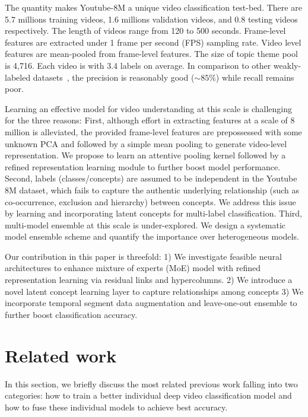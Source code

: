 \documentclass[10pt,twocolumn,letterpaper]{article}
\begin{document}


The quantity makes Youtube-8M a unique video classification test-bed. There are 5.7 millions training videos, 1.6 millions validation videos, and 0.8 testing videos respectively. The length of videos range from 120 to 500 seconds. Frame-level features are extracted under 1 frame per second (FPS) sampling rate. Video level features are mean-pooled from frame-level features. The size of topic theme pool is 4,716. Each video is with 3.4 labels on average. In comparison to other weakly-labeled datasets~\cite{jiang2017fcvid}, the precision is reasonably good ($\sim 85\%$) while recall remains poor.

Learning an effective model for video understanding at this scale is challenging for the three reasons:
First, although effort in extracting features at a scale of 8 million is alleviated, the provided frame-level features are prepossessed with some unknown PCA and followed by a simple mean pooling to generate video-level representation. We propose to learn an attentive pooling kernel followed by a refined representation learning module to further boost model performance. 
Second, labels (classes/concepts) are assumed to be independent in the Youtube 8M dataset, which fails to capture the authentic underlying relationship (such as co-occurrence, exclusion and hierarchy) between concepts. We address this issue by learning and incorporating latent concepts for multi-label classification.
Third, multi-model ensemble at this scale is under-explored. We design a systematic model ensemble scheme and quantify the importance over heterogeneous models.



    

Our contribution in this paper is threefold: 1) We investigate feasible neural architectures to enhance mixture of experts (MoE) model with refined representation learning via residual links and hypercolumns. 2) We introduce a novel latent concept learning layer to capture relationships among concepts 3) We incorporate temporal segment data augmentation and leave-one-out ensemble to further boost classification accuracy.



\section{Related work}
In this section, we briefly discuss the most related previous work falling into two categories: how to train a better individual deep video classification model and how to fuse these individual models to achieve best accuracy. 
\end{document}
